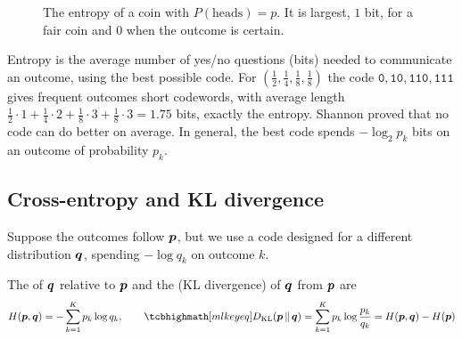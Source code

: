 \begin{figure}[htbp]
\centering
{}
\caption{The entropy of a coin with $P(\text{heads}) = p$. It is largest, $1$ bit,
  for a fair coin and $0$ when the outcome is certain.}
\label{fig:binary-entropy}
\end{figure}

\begin{intuition}
Entropy is the average number of yes/no questions (bits) needed to communicate
an outcome, using the best possible code. For
$\left(\frac12, \frac14, \frac18, \frac18\right)$ the code
$\texttt{0}, \texttt{10}, \texttt{110}, \texttt{111}$ gives frequent outcomes short
codewords, with average length $\frac12\cdot1 + \frac14\cdot2 + \frac18\cdot3 +
\frac18\cdot3 = 1.75$ bits, exactly the entropy. Shannon proved that no code can
do better on average. In general, the best code spends $-\log_2p_k$ bits on an
outcome of probability $p_k$.
\end{intuition}

\subsection{Cross-entropy and KL divergence}

Suppose the outcomes follow $\bm{p}$, but we use a code designed for a different
distribution $\bm{q}$, spending $-\log q_k$ on outcome $k$.

\begin{definition}\label{def:cross-entropy}
The  of $\bm{q}$ relative to $\bm{p}$ and the
 (KL divergence) of $\bm{q}$ from $\bm{p}$ are
\[
  H(\vp, \vq) = -\sum_{k=1}^K p_k\log q_k,
  \qquad
  \keyeq{D_{\KL}(\vp \,\Vert\, \vq) = \sum_{k=1}^K p_k\log\frac{p_k}{q_k}
  = H(\vp, \vq) - H(\vp)}
\]
\end{definition}

